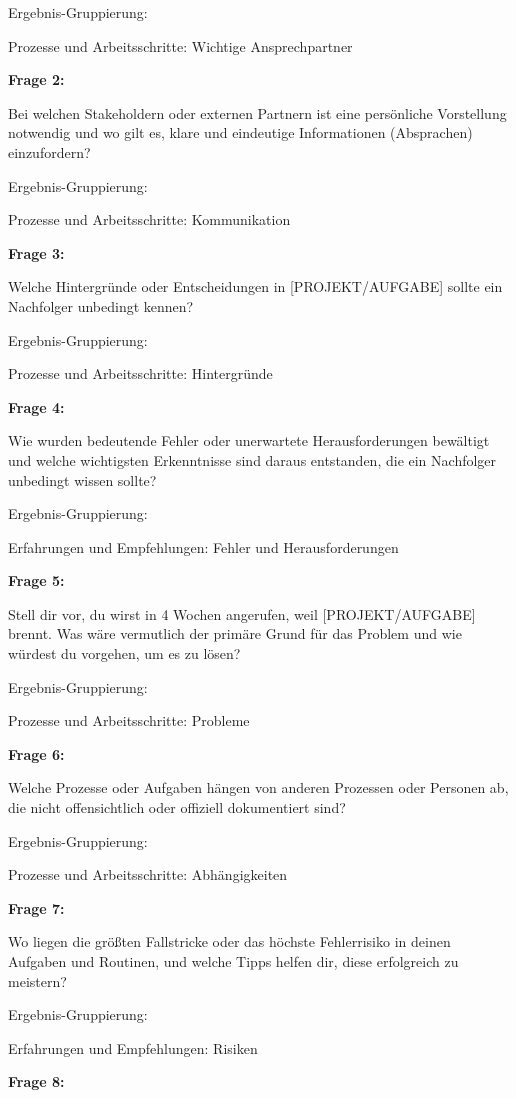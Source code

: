 \documentclass[
  10pt,
  ngerman,
  a4paper,
  toc=graduated,
  numbers=noenddot,
  headings=standardclasses,
  nonumberlist
]{scrartcl}
\begin{document}
Ergebnis-Gruppierung:

Prozesse und Arbeitsschritte: Wichtige Ansprechpartner

\textbf{Frage 2:}

Bei welchen Stakeholdern oder externen Partnern ist eine persönliche Vorstellung notwendig und wo gilt es, klare und eindeutige Informationen (Absprachen) einzufordern?

Ergebnis-Gruppierung:

Prozesse und Arbeitsschritte: Kommunikation

\textbf{Frage 3:}

Welche Hintergründe oder Entscheidungen in [PROJEKT/AUFGABE] sollte ein Nachfolger unbedingt kennen?

Ergebnis-Gruppierung:

Prozesse und Arbeitsschritte: Hintergründe

\textbf{Frage 4:}

Wie wurden bedeutende Fehler oder unerwartete Herausforderungen bewältigt und welche wichtigsten Erkenntnisse sind daraus entstanden, die ein Nachfolger unbedingt wissen sollte?

Ergebnis-Gruppierung:

Erfahrungen und Empfehlungen: Fehler und Herausforderungen

\textbf{Frage 5:}

Stell dir vor, du wirst in 4 Wochen angerufen, weil [PROJEKT/AUFGABE] brennt. Was wäre vermutlich der primäre Grund für das Problem und wie würdest du vorgehen, um es zu lösen?

Ergebnis-Gruppierung:

Prozesse und Arbeitsschritte: Probleme

\textbf{Frage 6:}

Welche Prozesse oder Aufgaben hängen von anderen Prozessen oder Personen ab, die nicht offensichtlich oder offiziell dokumentiert sind?

Ergebnis-Gruppierung:

Prozesse und Arbeitsschritte: Abhängigkeiten

\textbf{Frage 7:}

Wo liegen die größten Fallstricke oder das höchste Fehlerrisiko in deinen Aufgaben und Routinen, und welche Tipps helfen dir, diese erfolgreich zu meistern?

Ergebnis-Gruppierung:

Erfahrungen und Empfehlungen: Risiken

\textbf{Frage 8:}
\end{document}
